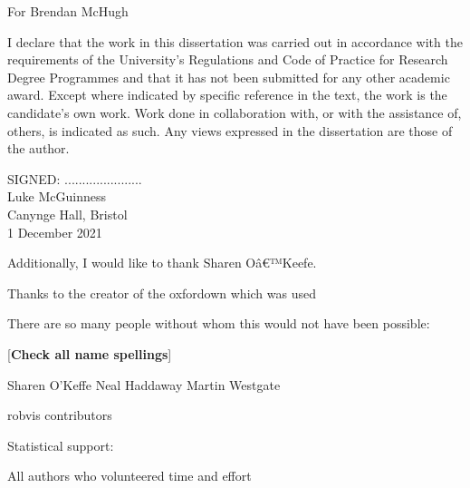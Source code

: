 \documentclass[a4paper, twoside]{templates/ociamthesis}
\begin{document}
\begin{romanpages}

\maketitle

\begin{dedication}
  For Brendan McHugh
\end{dedication}

\begin{declaration}
 	I declare that the work in this dissertation was carried out in accordance with the requirements of the University's Regulations and Code of Practice for Research Degree Programmes and that it has not been submitted for any other academic award. Except where indicated by specific reference in the text, the work is the candidate's own work. Work done in collaboration with, or with the assistance of, others, is indicated as such. Any views expressed in the dissertation are those of the author.

\begin{flushright}
SIGNED: ...................... \\
Luke McGuinness \\
Canynge Hall, Bristol \\
1 December 2021
\end{flushright}
\end{declaration}

\begin{acknowledgements}
 	Additionally, I would like to thank Sharen Oâ€™Keefe.

Thanks to the creator of the oxfordown which was used

There are so many people without whom this would not have been possible:

{[}\textbf{Check all name spellings}{]}

Sharen O'Keffe
Neal Haddaway
Martin Westgate

robvis contributors

Statistical support:

All authors who volunteered time and effort


\end{acknowledgements}
\end{romanpages}
\end{document}
